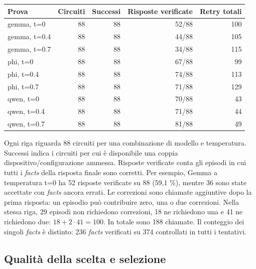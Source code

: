 \begin{center}\small\begin{tabular}{lrrrr}\toprule Prova & Circuiti & Successi & Risposte verificate & Retry totali\\\midrule

gemma, t=0 & 88 & 88 & 52/88 & 100\\

gemma, t=0.4 & 88 & 88 & 44/88 & 105\\

gemma, t=0.7 & 88 & 88 & 34/88 & 115\\

phi, t=0 & 88 & 88 & 67/88 & 99\\

phi, t=0.4 & 88 & 88 & 74/88 & 113\\

phi, t=0.7 & 88 & 88 & 71/88 & 129\\

qwen, t=0 & 88 & 88 & 70/88 & 43\\

qwen, t=0.4 & 88 & 88 & 71/88 & 44\\

qwen, t=0.7 & 88 & 88 & 81/88 & 49\\

\bottomrule\end{tabular}\end{center}


Ogni riga riguarda 88 circuiti per una combinazione di modello e temperatura.
Successi indica i circuiti per cui è disponibile una coppia dispositivo/configurazione ammessa.
Risposte verificate conta gli episodi in cui tutti i \textit{facts} della risposta
finale sono corretti.
Per esempio, Gemma a temperatura t=0 ha 52 risposte verificate su 88
(59,1 \%), mentre 36 sono state accettate con \textit{facts} ancora errati.
Le correzioni sono chiamate aggiuntive dopo la prima risposta: un episodio
può contribuire zero, una o due correzioni. Nella stessa riga, 29 episodi
non richiedono correzioni, 18 ne richiedono una e 41 ne richiedono due:
$18+2\cdot41=100$. In totale sono 188 chiamate. Il conteggio dei singoli \textit{facts}
è distinto: 236 \textit{facts} verificati su 374 controllati in tutti i tentativi.

\subsection{Qualità della scelta e selezione}

